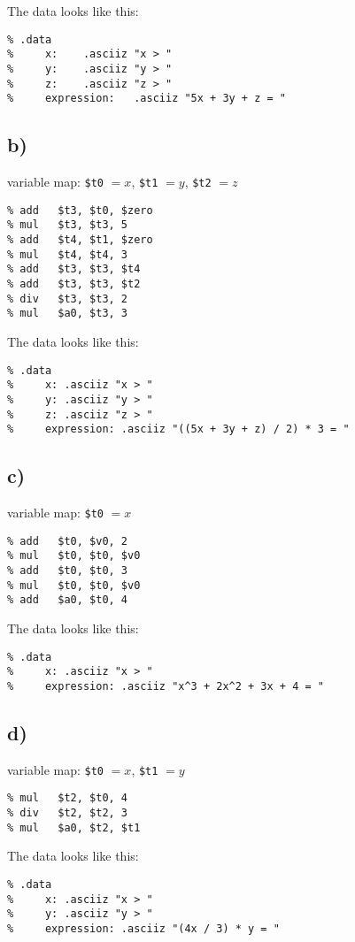 \documentclass{article}
\begin{document}
    The data looks like this:
    \begin{lstlisting}
% .data
%     x:    .asciiz "x > "
%     y:    .asciiz "y > "
%     z:    .asciiz "z > "
%     expression:   .asciiz "5x + 3y + z = "
    \end{lstlisting}

    \subsection*{b)}

    variable map: \verb|$t0| \(=x\), \verb|$t1| \(=y\), \verb|$t2| \(=z\)
    \begin{lstlisting}
% add	$t3, $t0, $zero
% mul	$t3, $t3, 5
% add	$t4, $t1, $zero
% mul	$t4, $t4, 3
% add	$t3, $t3, $t4
% add	$t3, $t3, $t2
% div	$t3, $t3, 2
% mul	$a0, $t3, 3
    \end{lstlisting}

    The data looks like this:
    \begin{lstlisting}
% .data
%     x: .asciiz "x > "
%     y: .asciiz "y > "
%     z: .asciiz "z > "
%     expression: .asciiz "((5x + 3y + z) / 2) * 3 = "
    \end{lstlisting}

    \subsection*{c)}

    variable map: \verb|$t0| \(=x\)
    \begin{lstlisting}
% add	$t0, $v0, 2
% mul	$t0, $t0, $v0
% add	$t0, $t0, 3
% mul	$t0, $t0, $v0
% add	$a0, $t0, 4
    \end{lstlisting}

    The data looks like this:
    \begin{lstlisting}
% .data
%     x: .asciiz "x > "
%     expression: .asciiz "x^3 + 2x^2 + 3x + 4 = "
    \end{lstlisting}

    \subsection*{d)}

    variable map: \verb|$t0| \(=x\), \verb|$t1| \(=y\)
    \begin{lstlisting}
% mul	$t2, $t0, 4
% div	$t2, $t2, 3
% mul	$a0, $t2, $t1
    \end{lstlisting}

    The data looks like this:
    \begin{lstlisting}
% .data
%     x: .asciiz "x > "
%     y: .asciiz "y > "
%     expression: .asciiz "(4x / 3) * y = "
    \end{lstlisting}
\end{document}
